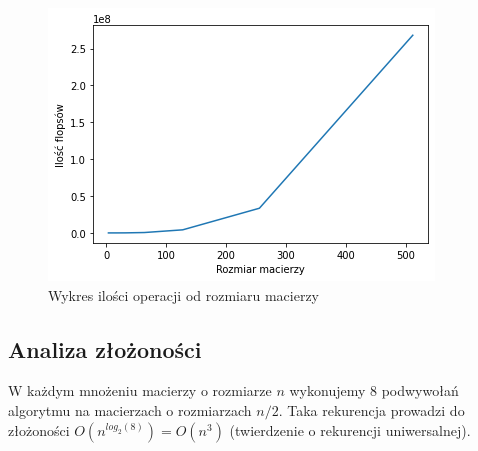 \documentclass[12pt,a4paper,table]{article}
\begin{document}
    \begin{figure}[H]
        \centering
        \includegraphics[width=0.6\linewidth]{img/binet_flops.png}
        \caption{Wykres ilości operacji od rozmiaru macierzy}
        \label{fig:binet_flops}
    \end{figure}

    \subsection{Analiza złożoności}
    W każdym mnożeniu macierzy o rozmiarze $n$ wykonujemy 8 podwywołań
    algorytmu na macierzach o rozmiarzach $n/2$. Taka rekurencja prowadzi do
    złożoności $O(n^{log_2(8)}) = O(n^{3})$  (twierdzenie o rekurencji uniwersalnej).

    \newpage
\end{document}
